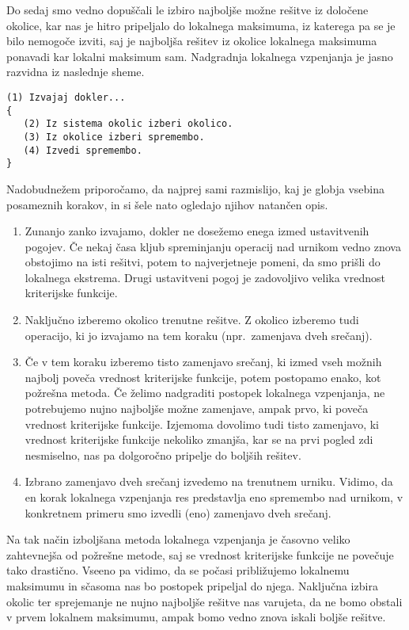 \documentclass[10pt, a4paper]{article}
\begin{document}
Do sedaj smo vedno dopuščali le izbiro najboljše možne rešitve iz določene okolice, kar nas
je hitro pripeljalo do lokalnega maksimuma, iz katerega pa se je bilo nemogoče izviti, saj
je najboljša rešitev iz okolice lokalnega maksimuma ponavadi kar lokalni maksimum sam.
Nadgradnja lokalnega vzpenjanja je jasno razvidna iz naslednje sheme.
\begin{verbatim}
(1) Izvajaj dokler...
{
   (2) Iz sistema okolic izberi okolico.
   (3) Iz okolice izberi spremembo.
   (4) Izvedi spremembo.
}
\end{verbatim}
Nadobudnežem priporočamo, da najprej sami razmislijo, kaj je globja vsebina posameznih
korakov, in si šele nato ogledajo njihov natančen opis.
\begin{enumerate}
   \item
      Zunanjo zanko izvajamo, dokler ne dosežemo enega izmed ustavitvenih pogojev.
      Če nekaj časa kljub spreminjanju operacij nad urnikom vedno znova obstojimo na isti
      rešitvi, potem to najverjetneje pomeni, da smo prišli do lokalnega ekstrema. Drugi
      ustavitveni pogoj je zadovoljivo velika vrednost kriterijske funkcije.
   \item
      Naključno izberemo okolico trenutne rešitve. Z okolico izberemo tudi operacijo,
      ki jo izvajamo na tem koraku (npr.\ zamenjava dveh srečanj).
   \item
      Če v tem koraku izberemo tisto zamenjavo srečanj, ki izmed vseh možnih najbolj
      poveča vrednost kriterijske funkcije, potem postopamo enako, kot požrešna metoda. Če
      želimo nadgraditi postopek lokalnega vzpenjanja, ne potrebujemo nujno najboljše možne
      zamenjave, ampak prvo, ki poveča vrednost kriterijske funkcije. Izjemoma dovolimo tudi
      tisto zamenjavo, ki vrednost kriterijske funkcije nekoliko zmanjša, kar se na prvi
      pogled zdi nesmiselno, nas pa dolgoročno pripelje do boljših rešitev.
   \item
      Izbrano zamenjavo dveh srečanj izvedemo na trenutnem urniku. Vidimo, da en korak
      lokalnega vzpenjanja res predstavlja eno spremembo nad urnikom, v konkretnem primeru
      smo izvedli (eno) zamenjavo dveh srečanj.
\end{enumerate}
Na tak način izboljšana metoda lokalnega vzpenjanja je časovno veliko zahtevnejša od
požrešne metode, saj se vrednost kriterijske funkcije ne povečuje tako drastično. Vseeno
pa vidimo, da se počasi približujemo lokalnemu maksimumu in sčasoma nas bo postopek
pripeljal do njega. Naključna izbira okolic ter sprejemanje ne nujno najboljše rešitve
nas varujeta, da ne bomo obstali v prvem lokalnem maksimumu, ampak bomo vedno znova
iskali boljše rešitve.
\end{document}
